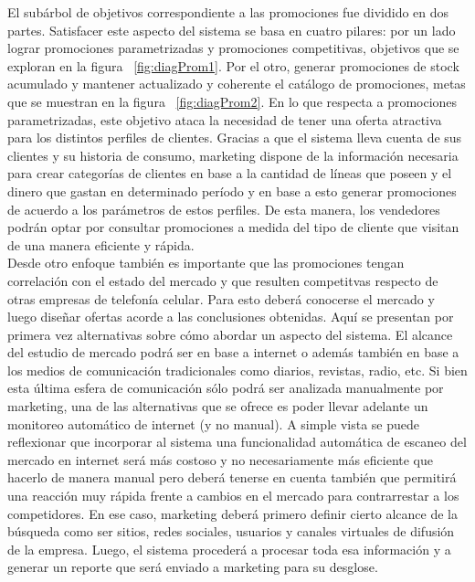 El subárbol de objetivos correspondiente a las promociones fue dividido en dos partes. Satisfacer este aspecto del sistema se basa en cuatro pilares: por un lado lograr promociones parametrizadas y promociones competitivas, objetivos que se exploran en la figura ~\ref{fig:diagProm1}. Por el otro, generar promociones de stock acumulado y mantener actualizado y coherente el catálogo de promociones, metas que se muestran en la figura ~\ref{fig:diagProm2}. En lo que respecta a promociones parametrizadas, este objetivo ataca la necesidad de tener una oferta atractiva para los distintos perfiles de clientes. Gracias a que el sistema lleva cuenta de sus clientes y su historia de consumo, marketing dispone de la información necesaria para crear categorías de clientes en base a la cantidad de líneas que poseen y el dinero que gastan en determinado período y en base a esto generar promociones de acuerdo a los parámetros de estos perfiles. De esta manera, los vendedores podrán optar por consultar promociones a medida del tipo de cliente que visitan de una manera eficiente y rápida.\\
\indent Desde otro enfoque también es importante que las promociones tengan correlación con el estado del mercado y que resulten competitvas respecto de otras empresas de telefonía celular. Para esto deberá conocerse el mercado y luego diseñar ofertas acorde a las conclusiones obtenidas. Aquí se presentan por primera vez alternativas sobre cómo abordar un aspecto del sistema. El alcance del estudio de mercado podrá ser en base a internet o además también en base a los medios de comunicación tradicionales como diarios, revistas, radio, etc. Si bien esta última esfera de comunicación sólo podrá ser analizada manualmente por marketing, una de las alternativas que se ofrece es poder llevar adelante un monitoreo automático de internet (y no manual). A simple vista se puede reflexionar que incorporar al sistema una funcionalidad automática de escaneo del mercado en internet será más costoso y no necesariamente más eficiente que hacerlo de manera manual pero deberá tenerse en cuenta también que permitirá una reacción muy rápida frente a cambios en el mercado para contrarrestar a los competidores. En ese caso, marketing deberá primero definir cierto alcance de la búsqueda como ser sitios, redes sociales, usuarios y canales virtuales de difusión de la empresa. Luego, el sistema procederá a procesar toda esa información y a generar un reporte que será enviado a marketing para su desglose.\\
